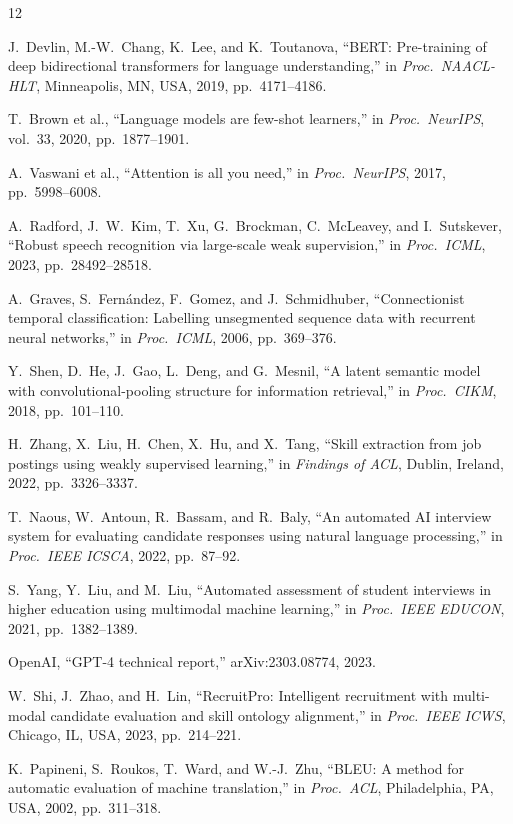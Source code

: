 \documentclass[conference]{IEEEtran}
\begin{document}

\begin{thebibliography}{12}

J.\ Devlin, M.-W.\ Chang, K.\ Lee, and K.\ Toutanova, ``BERT: Pre-training of deep bidirectional transformers for language understanding,'' in \textit{Proc.\ NAACL-HLT}, Minneapolis, MN, USA, 2019, pp.\ 4171--4186.

T.\ Brown et al., ``Language models are few-shot learners,'' in \textit{Proc.\ NeurIPS}, vol.\ 33, 2020, pp.\ 1877--1901.

A.\ Vaswani et al., ``Attention is all you need,'' in \textit{Proc.\ NeurIPS}, 2017, pp.\ 5998--6008.

A.\ Radford, J.\ W.\ Kim, T.\ Xu, G.\ Brockman, C.\ McLeavey, and I.\ Sutskever, ``Robust speech recognition via large-scale weak supervision,'' in \textit{Proc.\ ICML}, 2023, pp.\ 28492--28518.

A.\ Graves, S.\ Fern{\'a}ndez, F.\ Gomez, and J.\ Schmidhuber, ``Connectionist temporal classification: Labelling unsegmented sequence data with recurrent neural networks,'' in \textit{Proc.\ ICML}, 2006, pp.\ 369--376.

Y.\ Shen, D.\ He, J.\ Gao, L.\ Deng, and G.\ Mesnil, ``A latent semantic model with convolutional-pooling structure for information retrieval,'' in \textit{Proc.\ CIKM}, 2018, pp.\ 101--110.

H.\ Zhang, X.\ Liu, H.\ Chen, X.\ Hu, and X.\ Tang, ``Skill extraction from job postings using weakly supervised learning,'' in \textit{Findings of ACL}, Dublin, Ireland, 2022, pp.\ 3326--3337.

T.\ Naous, W.\ Antoun, R.\ Bassam, and R.\ Baly, ``An automated AI interview system for evaluating candidate responses using natural language processing,'' in \textit{Proc.\ IEEE ICSCA}, 2022, pp.\ 87--92.

S.\ Yang, Y.\ Liu, and M.\ Liu, ``Automated assessment of student interviews in higher education using multimodal machine learning,'' in \textit{Proc.\ IEEE EDUCON}, 2021, pp.\ 1382--1389.

OpenAI, ``GPT-4 technical report,'' arXiv:2303.08774, 2023.

W.\ Shi, J.\ Zhao, and H.\ Lin, ``RecruitPro: Intelligent recruitment with multi-modal candidate evaluation and skill ontology alignment,'' in \textit{Proc.\ IEEE ICWS}, Chicago, IL, USA, 2023, pp.\ 214--221.

K.\ Papineni, S.\ Roukos, T.\ Ward, and W.-J.\ Zhu, ``BLEU: A method for automatic evaluation of machine translation,'' in \textit{Proc.\ ACL}, Philadelphia, PA, USA, 2002, pp.\ 311--318.

\end{thebibliography}
\end{document}
